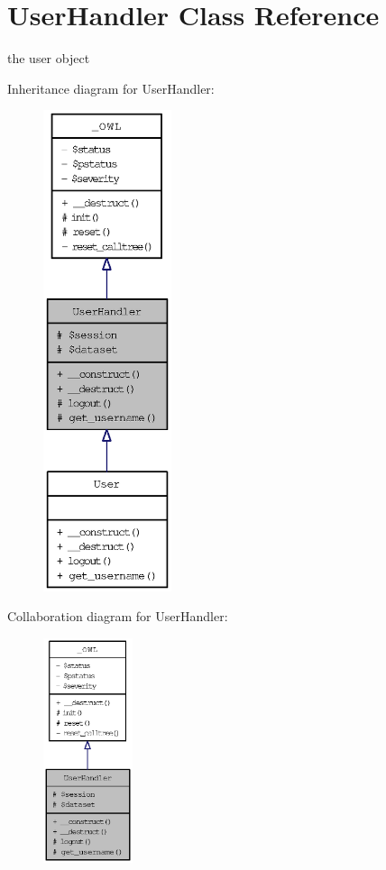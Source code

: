 \hypertarget{classUserHandler}{
\section{UserHandler Class Reference}
\label{classUserHandler}
}
the user object  


Inheritance diagram for UserHandler:\nopagebreak
\begin{figure}[H]
\begin{center}
\leavevmode
\includegraphics[height=400pt]{classUserHandler__inherit__graph}
\end{center}
\end{figure}
Collaboration diagram for UserHandler:\nopagebreak
\begin{figure}[H]
\begin{center}
\leavevmode
\includegraphics[width=74pt]{classUserHandler__coll__graph}
\end{center}
\end{figure}
